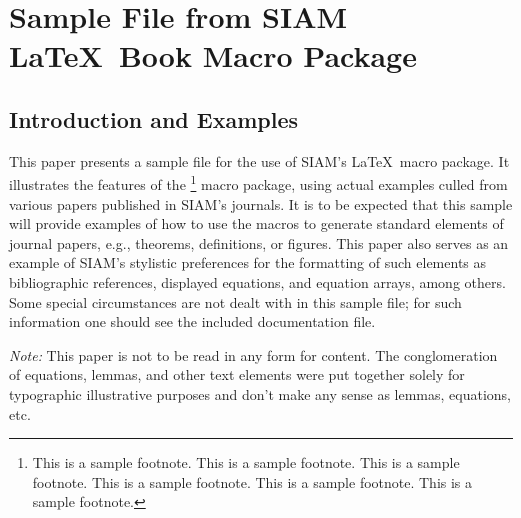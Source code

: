 
\chapter{Sample File from SIAM \LaTeX\ Book Macro Package}


\newtheorem{theorem}{Theorem}
\newtheorem{lemma}{Lemma}
\newtheorem{proposition}{Proposition}
\newtheorem{corollary}{Corollary}
\newtheorem{definition}{Definition}

\newcommand{\pe}{\psi}
\def\d{\delta} 
\def\ds{\displaystyle} 
\def\e{{\epsilon}} 
\def\eb{\bar{\eta}}  
\def\enorm#1{\|#1\|_2} 
\def\Fp{F^\prime}  
\def\fishpack{{FISHPACK}} 
\def\fortran{{FORTRAN}} 
\def\gmres{{GMRES}} 
\def\gmresm{{\rm GMRES($m$)}} 
\def\Kc{{\cal K}} 
\def\norm#1{\|#1\|} 
\def\wb{{\bar w}} 
\def\zb{{\bar z}} 
\def\bfE{\mbox{\boldmath$E$}}
\def\bfG{\mbox{\boldmath$G$}}


\section{Introduction and Examples}
This paper presents a sample file for the use of SIAM's
\LaTeX\ macro package. It illustrates the features of the%
\footnote{This is a sample footnote. This is a sample footnote. 
This is a sample footnote. This is a sample footnote. 
This is a sample footnote. This is a sample footnote.}
macro package, using actual examples culled from various
papers published in SIAM's journals. It is to be expected
that this sample will provide examples of how to use the
macros to generate standard elements of journal papers,
e.g., theorems, definitions, or figures. This paper also
serves as an example of SIAM's stylistic preferences for
the formatting of such elements as bibliographic references,
displayed equations, and equation arrays, among others.
Some special circumstances are not dealt with in this
sample file; for such information one should see the
included documentation file.

{\em Note:} This paper is not to be read in any form for content. 
The conglomeration of equations, lemmas, and other text elements were 
put together solely for typographic illustrative purposes and don't 
make any sense as lemmas, equations, etc.

